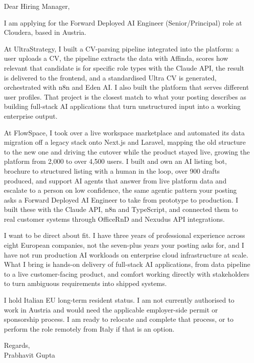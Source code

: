 \documentclass[a4paper,11pt]{article}
\begin{document}
Dear Hiring Manager,

I am applying for the Forward Deployed AI Engineer (Senior/Principal) role at Cloudera, based in Austria.

At UltraStrategy, I built a CV-parsing pipeline integrated into the platform: a user uploads a CV, the pipeline extracts the data with Affinda, scores how relevant that candidate is for specific role types with the Claude API, the result is delivered to the frontend, and a standardised Ultra CV is generated, orchestrated with n8n and Eden AI. I also built the platform that serves different user profiles. That project is the closest match to what your posting describes as building full-stack AI applications that turn unstructured input into a working enterprise output.

At FlowSpace, I took over a live workspace marketplace and automated its data migration off a legacy stack onto Next.js and Laravel, mapping the old structure to the new one and driving the cutover while the product stayed live, growing the platform from 2,000 to over 4,500 users. I built and own an AI listing bot, brochure to structured listing with a human in the loop, over 900 drafts produced, and support AI agents that answer from live platform data and escalate to a person on low confidence, the same agentic pattern your posting asks a Forward Deployed AI Engineer to take from prototype to production. I built these with the Claude API, n8n and TypeScript, and connected them to real customer systems through OfficeRnD and Nexudus API integrations.

I want to be direct about fit. I have three years of professional experience across eight European companies, not the seven-plus years your posting asks for, and I have not run production AI workloads on enterprise cloud infrastructure at scale. What I bring is hands-on delivery of full-stack AI applications, from data pipeline to a live customer-facing product, and comfort working directly with stakeholders to turn ambiguous requirements into shipped systems.

I hold Italian EU long-term resident status. I am not currently authorised to work in Austria and would need the applicable employer-side permit or sponsorship process. I am ready to relocate and complete that process, or to perform the role remotely from Italy if that is an option.

Regards,\\
Prabhavit Gupta
\end{document}
